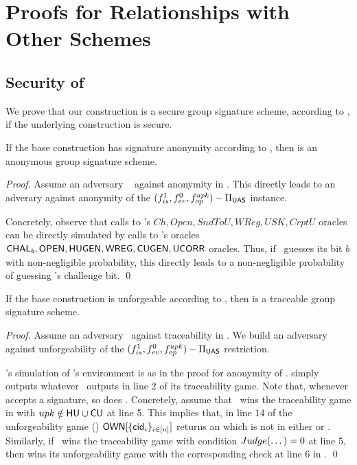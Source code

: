 \section{Proofs for Relationships with Other Schemes}
\label{app:related-proofs}

\subsection{Security of \CUASGS}

We prove that our \CUASGS construction is a secure group signature scheme,
according to \cite{bsz05}, if the underlying \CUASGen construction is secure.

\begin{theorem}
  If the base \CUASGen construction has signature anonymity according to
  , then \CUASGS is an anonymous group
  signature scheme.
\end{theorem}

\begin{proof}
  Assume an adversary \adv~ against anonymity in \CUASGS. This directly leads
  to an adverary \advB against anonymity of the $(f_{is}^1,f_{ev}^0,
  f_{op}^{upk})-\Pi_{\mathsf{UAS}}$ instance.

  Concretely, observe that calls to \adv's $Ch,Open,SndToU,WReg,USK,CrptU$
  oracles can be directly simulated by calls to \advB's oracles $\mathsf{CHAL}_b,
  \mathsf{OPEN},\mathsf{HUGEN},\mathsf{WREG},\mathsf{CUGEN},\mathsf{UCORR}$ oracles. Thus, if \adv~guesses its bit $b$
  with non-negligible probability, this directly leads to a non-negligible
  probability of guessing \advB's challenge bit.
  \qed
\end{proof}

\begin{theorem}
  If the base \CUASGen construction is unforgeable according to
  , then \CUASGS is a traceable group signature
  scheme.
\end{theorem}

\begin{proof}
  Assume an adversary \adv~against traceability in \CUASGS. We build an
  adversary \advB against unforgeability of the $(f_{is}^1,f_{ev}^0,
  f_{op}^{upk})-\Pi_{\mathsf{UAS}}$ restriction.

  \advB's simulation of \adv's environment is as in the proof for anonymity
  of \CUASGS. \advB simply outputs whatever \adv~outputs in line 2 of its
  traceability game. Note that, whenever \CUASGS accepts a signature, so does
  \CUASGen. Concretely,
  assume that \adv~wins the traceability game in  with
  $upk \notin \mathsf{HU} \cup \mathsf{CU}$ at line 5. This implies that, in line 14 of the
  \UAS unforgeability game () $\mathsf{OWN}[\lbrace \mathsf{cid}_i
  \rbrace_{i\in[n]}]$ returns an \uid which is not in either \HU or \CU.
  Similarly, if \adv~wins the traceability game with condition $Judge(\dots)=0$
  at line 5, then \advB wins its unforgeability game with the corresponding
  check at line 6 in .
  \qed
\end{proof}

